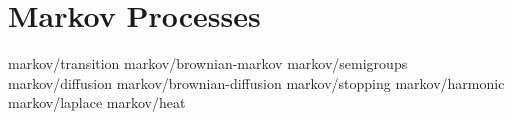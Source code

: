 \chapter	{Markov Processes}

	{markov/transition}
	{markov/brownian-markov}
	{markov/semigroups}
	{markov/diffusion}
	{markov/brownian-diffusion}
	{markov/stopping}
	{markov/harmonic}
	{markov/laplace}
	{markov/heat}
